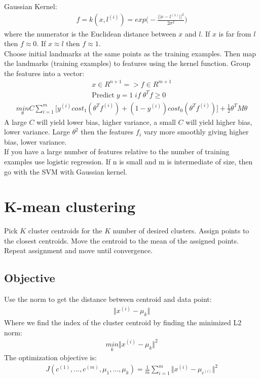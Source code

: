 \documentclass[12pt]{article}
\begin{document}
Gaussian Kernel:
\begin{align*}
	f = k(x, l^{(i)})=exp\bigg(-\frac{||x-l^{(1)}||^2}{2\sigma^2}\bigg)
\end{align*}
where the numerator is the Euclidean distance between $x$ and $l$. If $x$ is far from $l$ then $f\approx 0$.  If $x\approx l$ then $f\approx 1$. \\ 

Choose initial landmarks at the same points as the training examples. Then map the landmarks (training examples) to features using the kernel function. Group the features into a vector:
\begin{align*}
	x\in R^{n+1} => f\in R^{m+1} \\
	\text{Predict}\; y=1\; if\; \theta^Tf\ge 0
\end{align*} 
\begin{align*}
\underset{\theta}{min}C\sum_{i=1}^{m}\bigg[y^{(i)}cost_1(\theta^Tf^{(i)})+(1-y^{(i)})cost_0(\theta^Tf^{(i)})\bigg] + \frac{1}{2}\theta^TM\theta
\end{align*}
 A large $C$ will yield lower bias, higher variance, a small $C$ will yield higher bias, lower variance. Large $\theta^2$ then the features $f_i$ vary more smoothly giving higher bias, lower variance. \\
 
 If you have a large number of features relative to the number of training examples use logistic regression. If n is small and m is intermediate of size, then go with the SVM with Gaussian kernel.
 
\section{K-mean clustering}
Pick $K$ cluster centroids for the $K$ number of desired clusters. Assign points to the closest centroids. Move the centroid to the mean of the assigned points. Repeat assignment and move until convergence. 

\subsection{Objective}
Use the norm to get the distance between centroid and data point:
\begin{align*}
	\Vert x^{(i)} - \mu_k\Vert
\end{align*}
Where we find the index of the cluster centroid by finding the minimized L2 norm:
\begin{align*}
	\underset{k}{min}\Vert x^{(i)} - \mu_k\Vert^2
\end{align*}
The optimization objective is:
\begin{align*}
J(c^{(1)},...,c^{(m)},\mu_1,...,\mu_k) = \frac{1}{m}\sum_{i=1}^{m}\Vert x^{(i)} - \mu_{c^(i)}\Vert^2
\end{align*}
\end{document}
